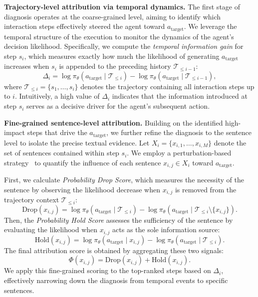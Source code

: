 \textbf{Trajectory-level attribution via temporal dynamics.}
The first stage of diagnosis operates at the coarse-grained level, aiming to identify which interaction steps effectively steered the agent toward $a_{\text{target}}$. We leverage the temporal structure of the execution to monitor the dynamics of the agent's decision likelihood.
Specifically, we compute the \textit{temporal information gain} for step $s_i$, which measures exactly how much the likelihood of generating $a_{\text{target}}$ increases when $s_i$ is appended to the preceding history $\mathcal{T}_{\le i-1}$:
\begin{equation}
    \Delta_i = \log \pi_\theta(a_{\text{target}} \mid \mathcal{T}_{\le i}) - \log \pi_\theta(a_{\text{target}} \mid \mathcal{T}_{\le i-1}),
\end{equation}
where $\mathcal{T}_{\le i} = \{s_1, \dots, s_i\}$ denotes the trajectory containing all interaction steps up to $i$.
Intuitively, a high value of $\Delta_i$ indicates that the information introduced at step $s_i$ serves as a decisive driver for the agent's subsequent action.

\textbf{Fine-grained sentence-level attribution.}
Building on the identified high-impact steps that drive the $a_{\text{target}}$, we further refine the diagnosis to the sentence level to isolate the precise textual evidence.
Let $X_i = \{x_{i,1}, \dots, x_{i,M}\}$ denote the set of sentences contained within step $s_i$. We employ a perturbation-based strategy~\citep{chuang2025selfcite,lei2016rationalizing,cohen2024contextcite,liu2024attribot} to quantify the influence of each sentence $x_{i,j} \in X_i$ toward $a_{\text{target}}$.

First, we calculate \textit{Probability Drop Score}, which measures the necessity of the sentence by observing the likelihood decrease when $x_{i,j}$ is removed from the trajectory context $\mathcal{T}_{\le i}$:
\begin{equation}
    \text{Drop}(x_{i,j}) = \log \pi_\theta(a_{\text{target}} \mid \mathcal{T}_{\le i}) - \log \pi_\theta(a_{\text{target}} \mid \mathcal{T}_{\le i} \setminus \{x_{i,j}\}).
\end{equation}
Then, the \textit{Probability Hold Score} assesses the sufficiency of the sentence by evaluating the likelihood when $x_{i,j}$ acts as the sole information source:
\begin{equation}
    \text{Hold}(x_{i,j}) = \log \pi_\theta(a_{\text{target}} \mid x_{i,j}) - \log \pi_\theta(a_{\text{target}} \mid \mathcal{T}_{\le i}).
\end{equation}
The final attribution score is obtained by aggregating these two signals: 
\begin{equation}
    \Phi(x_{i,j}) = \text{Drop}(x_{i,j}) + \text{Hold}(x_{i,j}).
\end{equation}
We apply this fine-grained scoring to the top-ranked steps based on $\Delta_i$, effectively narrowing down the diagnosis from temporal events to specific sentences.



